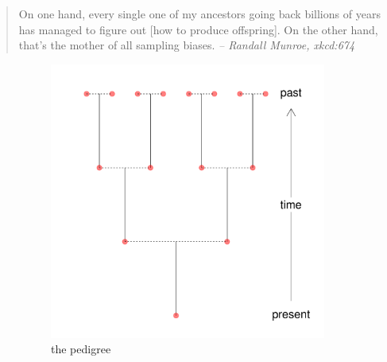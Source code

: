 \documentclass{ar-1col}
\newcommand{\plr}[1]{{\color{green}{#1}}}
\begin{document}
\begin{quote}
    On one hand, every single one of my ancestors going back billions of years
    has managed to figure out [how to produce offspring].
    On the other hand, that's the mother of all sampling biases.
    \hfill \emph{-- Randall Munroe, xkcd:674}
\end{quote}

\plr{Move discussion about bias due to long-term fitness here.}

\begin{figure}[ht]
    \centering
    \begin{subfigure}{0.35\textwidth}
        \centering
        \includegraphics[width=\linewidth]{figs/pedigree.pdf}
        \caption{the pedigree}
        \label{pedigree}
    \end{subfigure}
    \begin{subfigure}{0.55\textwidth}
        \centering

\end{subfigure}
\end{figure}
\end{document}

